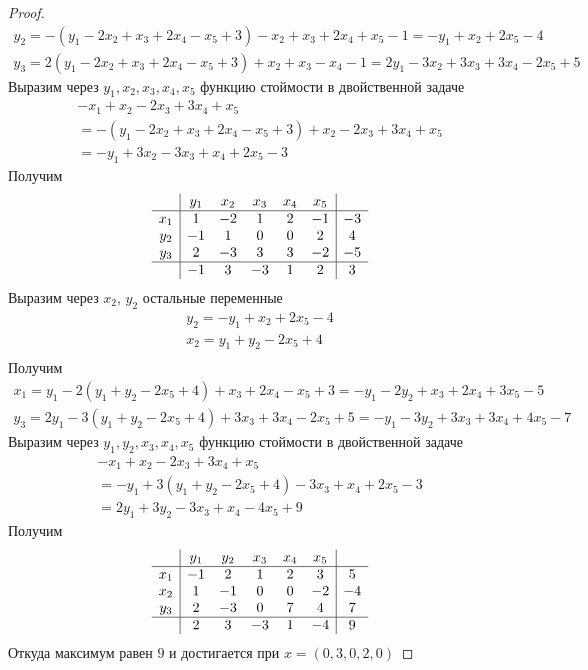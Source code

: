 \begin{proof}
\begin{gather*}
		y_{2}
		= -(y_{1} - 2x_{2} + x_{3} + 2x_{4} - x_{5} + 3) - x_{2} + x_{3} + 2x_{4} + x_{5} - 1
		= -y_{1} + x_{2} + 2x_{5} - 4\\
		y_{3}
		= 2(y_{1} - 2x_{2} + x_{3} + 2x_{4} - x_{5} + 3) + x_{2} + x_{3} - x_{4} - 1
		= 2y_{1} - 3x_{2} + 3x_{3} + 3x_{4} - 2x_{5} + 5
	\end{gather*}
	Выразим через $y_{1}, x_{2}, x_{3}, x_{4}, x_{5}$ функцию стоймости в двойственной задаче
	\begin{gather*}
		-x_{1} + x_{2} - 2x_{3} + 3x_{4} + x_{5}\\
		= -(y_{1} - 2x_{2} + x_{3} + 2x_{4} - x_{5} + 3) + x_{2} - 2x_{3} + 3x_{4} + x_{5}\\
		= -y_{1} + 3x_{2} - 3x_{3} + x_{4} + 2x_{5} - 3
	\end{gather*}
	Получим
	\begin{gather*}
	\begin{array}{c|ccccc|c} 
		& y_{1} & x_{2} & x_{3} & x_{4} & x_{5} & \\
		\hline 
		x_{1} & 1 & -2 & 1 & 2 & -1 & -3\\
		y_{2} & -1 & 1 & 0 & 0 & 2 & 4\\
		y_{3} & 2 & -3 & 3 & 3 & -2 & -5\\
		\hline 
		& -1 & 3 & -3 & 1 & 2 & 3
	\end{array}
	\end{gather*}
	Выразим через $x_{2}$, $y_{2}$ остальные переменные
	\begin{gather*}
		y_{2} = -y_{1} + x_{2} + 2x_{5} - 4\\
		x_{2} = y_{1} + y_{2} - 2x_{5} + 4\\
	\end{gather*}
	Получим
	\begin{gather*}
		x_{1} 
		= y_{1} - 2(y_{1} + y_{2} - 2x_{5} + 4) + x_{3} + 2x_{4} - x_{5} + 3
		= -y_{1} - 2y_{2} + x_{3} + 2x_{4} + 3x_{5} - 5\\
		y_{3}
		= 2y_{1} - 3(y_{1} + y_{2} - 2x_{5} + 4) + 3x_{3} + 3x_{4} - 2x_{5} + 5
		= -y_{1} - 3y_{2} + 3x_{3} + 3x_{4} + 4x_{5} - 7
	\end{gather*}
	Выразим через $y_{1}, y_{2}, x_{3}, x_{4}, x_{5}$ функцию стоймости в двойственной задаче
	\begin{gather*}
		-x_{1} + x_{2} - 2x_{3} + 3x_{4} + x_{5}\\
		= -y_{1} + 3(y_{1} + y_{2} - 2x_{5} + 4) - 3x_{3} + x_{4} + 2x_{5} - 3\\
		= 2y_{1} + 3y_{2} - 3x_{3} + x_{4} - 4x_{5} + 9
	\end{gather*}
	Получим
	\begin{gather*}
	\begin{array}{c|ccccc|c} 
		& y_{1} & y_{2} & x_{3} & x_{4} & x_{5} & \\
		\hline 
		x_{1} & -1 & 2 & 1 & 2 & 3 & 5\\
		x_{2} & 1 & -1 & 0 & 0 & -2 & -4\\
		y_{3} & 2 & -3 & 0 & 7 & 4 & 7\\
		\hline 
		& 2 & 3 & -3 & 1 & -4 & 9
	\end{array}
	\end{gather*}
	Откуда максимум равен $9$ и достигается при $x = (0, 3, 0, 2, 0)$
\end{proof}
